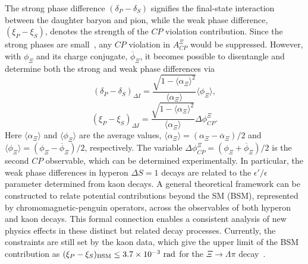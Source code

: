 \documentclass[aps,amsmath,amssymb,reprint]{revtex4-2}
\begin{document}
\noindent
The strong phase difference $(\delta_P-\delta_S)$ signifies the final-state interaction between the daughter baryon and pion,
while the weak phase difference, $(\xi_P - \xi_S)$, denotes the strength of the $CP$ violation contribution. Since the strong phases are small~\cite{BESIII:2021ypr,Salone:2022lpt}, any $CP$ violation in $A_{CP}^{\Xi}$ would be suppressed. However, with $\phi_\Xi$ and its charge conjugate, $\overline{\phi}_\Xi$, it becomes possible to disentangle and determine both the strong and weak phase differences via
\begin{equation}
(\delta_P - \delta_S)_{\Delta I} = \frac{\sqrt{1-\langle\alpha_\Xi\rangle^2}}{\langle\alpha_\Xi\rangle} \langle\phi_\Xi\rangle,
\label{eq:strP}
\end{equation}
\begin{equation}
(\xi_P - \xi_S)_{\Delta I} = \frac{\sqrt{1-\langle\alpha_\Xi\rangle^2}}{\langle\alpha_\Xi\rangle} \Delta\phi_{CP}^{\Xi}.
\label{eq:weakP}
\end{equation}
Here $\langle\alpha_\Xi\rangle$ and $\langle\phi_\Xi\rangle$ are the average values, $\langle\alpha_\Xi\rangle=(\alpha_{\Xi}-\overline{\alpha}_{\Xi})/2$ and $\langle\phi_\Xi\rangle=(\phi_{\Xi}-\overline{\phi}_{\Xi})/2$, respectively. The variable $\Delta\phi_{CP}^{\Xi}=(\phi_{\Xi}+\overline{\phi}_{\Xi})/2$ is the second $CP$ observable, which can be determined experimentally.
In particular, the weak phase differences in hyperon $\Delta S=1$ decays are related to the $\epsilon'/\epsilon$ parameter determined from kaon decays. A general theoretical framework can be constructed to relate potential contributions beyond the SM (BSM), represented by chromomagnetic-penguin operators, across the observables of both hyperon and kaon decays. This formal connection enables a consistent analysis of new physics effects in these distinct but related decay processes. Currently, the constraints are still set by the kaon data, which give the upper limit of the BSM contribution as $(\xi_P-\xi_S)_{\rm BSM} \leq 3.7\times10^{-3}~\text{rad}$ for the $\Xi\to \Lambda \pi$ decay~\cite{Tandean:2003fr, Salone:2022lpt}.
\end{document}
